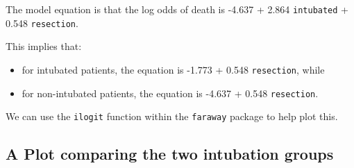 \documentclass[]{book}
\providecommand{\tightlist}{%
  \setlength{\itemsep}{0pt}\setlength{\parskip}{0pt}}
\theoremstyle{definition}
\theoremstyle{definition}
\theoremstyle{definition}
\theoremstyle{remark}
\begin{document}
The model equation is that the log odds of death is -4.637 + 2.864
\texttt{intubated} + 0.548 \texttt{resection}.

This implies that:

\begin{itemize}
\tightlist
\item
  for intubated patients, the equation is -1.773 + 0.548
  \texttt{resection}, while
\item
  for non-intubated patients, the equation is -4.637 + 0.548
  \texttt{resection}.
\end{itemize}

We can use the \texttt{ilogit} function within the \texttt{faraway}
package to help plot this.

\subsection{A Plot comparing the two intubation
groups}\label{a-plot-comparing-the-two-intubation-groups}
\end{document}
